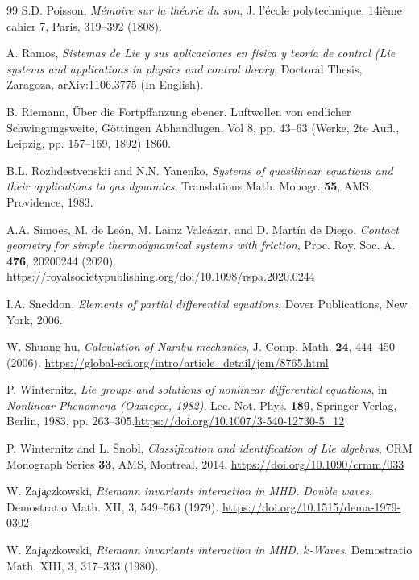 \documentclass[12pt]{article}
\theoremstyle{plain}
\theoremstyle{definition}
\numberwithin{equation}{section}
\begin{document}
\begin{thebibliography}{99}
S.D. Poisson, {\sl M\'emoire sur la th\'eorie du son}, J. l'\'ecole polytechnique, 14i\`eme cahier 7, Paris, 319--392 (1808).

A. Ramos, {\sl Sistemas de Lie y sus aplicaciones en física y teoría de control (Lie systems and applications in physics and control theory}, Doctoral Thesis, Zaragoza, arXiv:1106.3775 (In English).

B. Riemann, \"Uber die Fortpffanzung ebener. Luftwellen von endlicher Schwingungsweite, G\"ottingen Abhandlugen, Vol 8, pp. 43--63 (Werke, 2te Aufl., Leipzig, pp. 157--169, 1892) 1860.

B.L. Rozhdestvenskii and N.N. Yanenko, {\sl Systems of quasilinear equations and their applications to gas dynamics}, Translations Math. Monogr. {\bf 55}, AMS, Providence, 1983.

A.A. Simoes, M. de Le\'on, M. Lainz Valc\'azar, and D. Mart\'{i}n de Diego, 
{\it Contact geometry for simple thermodynamical systems with friction}, 
Proc. Roy. Soc. A. {\bf 476}, 20200244 (2020).  \url{https://royalsocietypublishing.org/doi/10.1098/rspa.2020.0244}

I.A. Sneddon,
{\sl Elements of partial differential equations}, Dover Publications, New York, 2006.

W. Shuang-hu,
{\it Calculation of Nambu mechanics},  J. Comp. Math. {\bf 24}, 444--450 (2006).  \url{https://global-sci.org/intro/article_detail/jcm/8765.html}

P. Winternitz, {\it Lie groups and solutions of nonlinear differential equations}, in {\sl Nonlinear Phenomena (Oaxtepec, 1982)}, Lec. Not. Phys. { \bf 189}, Springer-Verlag, Berlin, 1983, pp. 263--305.\url{https://doi.org/10.1007/3-540-12730-5_12}

P. Winternitz and L. \v{S}nobl, 
{\sl Classification and identification of Lie algebras}, CRM Monograph Series {\bf 33}, AMS, Montreal, 2014. \url{https://doi.org/10.1090/crmm/033}

W. Zaj\c aczkowski,  {\it Riemann invariants interaction in MHD. Double waves}, Demostratio Math. XII, 3, 549--563 (1979). \url{https://doi.org/10.1515/dema-1979-0302}

W. Zaj\c aczkowski,  {\it Riemann invariants interaction in MHD. $k$-Waves}, Demostratio Math. XIII, 3, 317--333 (1980).
\end{thebibliography}
\end{document}
